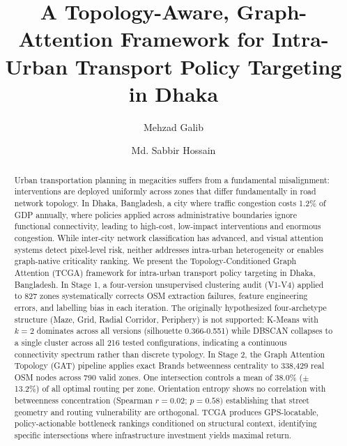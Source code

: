 \documentclass[sigconf, nonacm]{acmart}
\begin{document}
\title{A Topology-Aware, Graph-Attention Framework for Intra-Urban Transport Policy Targeting in Dhaka}

\author{Mehzad Galib}

\author{Md. Sabbir Hossain}

\begin{abstract}
Urban transportation planning in megacities suffers from a fundamental misalignment: interventions are deployed uniformly across zones that differ fundamentally in road network topology. In Dhaka, Bangladesh, a city where traffic congestion costs 1.2\% of GDP annually, where policies applied across administrative boundaries ignore functional connectivity, leading to high-cost, low-impact interventions and enormous congestion. While inter-city network classification has advanced, and visual attention systems detect pixel-level risk, neither addresses intra-urban heterogeneity or enables graph-native criticality ranking. We present the Topology-Conditioned Graph Attention (TCGA) framework for intra-urban transport policy targeting in Dhaka, Bangladesh. In Stage 1, a four-version unsupervised clustering audit (V1-V4) applied to 827 zones systematically corrects OSM extraction failures, feature engineering errors, and labelling bias in each iteration. The originally hypothesized four-archetype structure (Maze, Grid, Radial Corridor, Periphery) is not supported: K-Means with $k=2$ dominates across all versions (silhouette 0.366-0.551) while DBSCAN collapses to a single cluster across all 216 tested configurations, indicating a continuous connectivity spectrum rather than discrete typology. In Stage 2, the Graph Attention Topology (GAT) pipeline applies exact Brands betweenness centrality to 338,429 real OSM nodes across 790 valid zones. One intersection controls a mean of 38.0\% ($\pm$ 13.2\%) of all optimal routing per zone. Orientation entropy shows no correlation with betweenness concentration (Spearman $r=0.02$; $p=0.58)$ establishing that street geometry and routing vulnerability are orthogonal. TCGA produces GPS-locatable, policy-actionable bottleneck rankings conditioned on structural context, identifying specific intersections where infrastructure investment yields maximal return.
\end{abstract}
\end{document}

